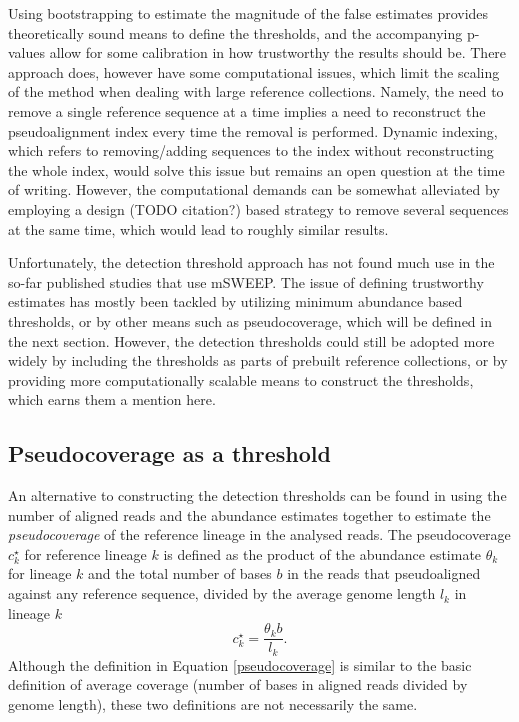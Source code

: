 \documentclass[officiallayout]{tktla}
\begin{document}
Using bootstrapping to estimate the magnitude of the false estimates
provides theoretically sound means to define the thresholds, and the
accompanying p-values allow for some calibration in how trustworthy
the results should be. There approach does, however have some
computational issues, which limit the scaling of the method when
dealing with large reference collections. Namely, the need to remove a
single reference sequence at a time implies a need to reconstruct the
pseudoalignment index every time the removal is performed. Dynamic
indexing, which refers to removing/adding sequences to the index
without reconstructing the whole index, would solve this issue but
remains an open question at the time of writing. However, the
computational demands can be somewhat alleviated by employing a design
(TODO citation?) based strategy to remove several sequences at the
same time, which would lead to roughly similar results.

Unfortunately, the detection threshold approach has not found much use
in the so-far published studies that use mSWEEP. The issue of defining
trustworthy estimates has mostly been tackled by utilizing minimum
abundance based thresholds, or by other means such as pseudocoverage,
which will be defined in the next section. However, the detection
thresholds could still be adopted more widely by including the
thresholds as parts of prebuilt reference collections, or by providing
more computationally scalable means to construct the thresholds, which
earns them a mention here.

\subsection{Pseudocoverage as a threshold}

An alternative to constructing the detection thresholds can be found
in using the number of aligned reads and the abundance estimates
together to estimate the \textit{pseudocoverage} of the reference
lineage in the analysed reads. The pseudocoverage $c^{\star}_{k}$ for
reference lineage $k$ is defined as the product of the abundance
estimate $\theta_{k}$ for lineage $k$ and the total number of bases
$b$ in the reads that pseudoaligned against any reference sequence,
divided by the average genome length $l_{k}$ in lineage $k$
\begin{equation}
  \label{pseudocoverage}
  c_{k}^{\star} = \frac{\theta_{k}b}{l_{k}}.
\end{equation}
Although the definition in Equation \ref{pseudocoverage} is similar to
the basic definition of average coverage (number of bases in aligned
reads divided by genome length), these two definitions are not
necessarily the same.
\end{document}
